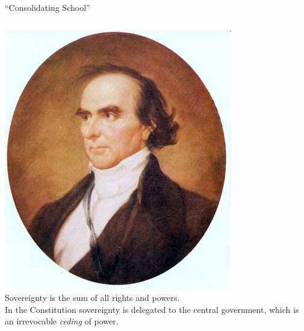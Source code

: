 \begin{frame}{``Consolidating School''}
\begin{columns}[c]
            \includegraphics[height=0.4\textheight]{img/daniel-webster-portrait.png} \\
        \column{0.5\textheight}
            Sovereignty is the sum of all rights and powers. \\
            In the Constitution sovereignty is delegated to the central government, which is an irrevocable \emph{ceding} of power.
    \end{columns}
\end{frame}

